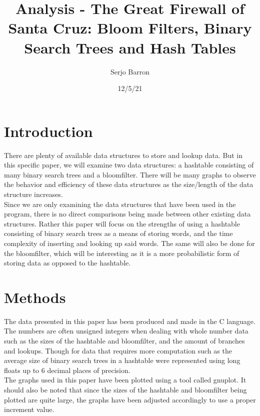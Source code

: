 \documentclass[
	12pt, %
]{fphw}
\title{Analysis - The Great Firewall of Santa Cruz:
Bloom Filters, Binary Search Trees and Hash Tables} %
\author{Serjo Barron} %
\date{12/5/21} %
\begin{document}
\maketitle %


\section{Introduction}

\hspace{15pt} There are plenty of available data structures to store and lookup data. But in this specific paper, we will examine two data structures: a hashtable consisting of many binary search trees and a bloomfilter. There will be many graphs to observe the behavior and efficiency of these data structures as the size/length of the data structure increases. \\
Since we are only examining the data structures that have been used in the program, there is no direct comparisons being made between other existing data structures. Rather this paper will focus on the strengths of using a hashtable consisting of binary search trees as a means of storing words, and the time complexity of inserting and looking up said words. The same will also be done for the bloomfilter, which will be interesting as it is a more probabilistic form of storing data as opposed to the hashtable.


\section{Methods}

\hspace{15pt} The data presented in this paper has been produced and made in the C language. The numbers are often unsigned integers when dealing with whole number data such as the sizes of the hashtable and bloomfilter, and the amount of branches and lookups. Though for data that requires more computation such as the average size of binary search trees in a hashtable were represented using long floats up to 6 decimal places of precision. \\
The graphs used in this paper have been plotted using a tool called gnuplot. It should also be noted that since the sizes of the hashtable and bloomfilter being plotted are quite large, the graphs have been adjusted accordingly to use a proper increment value.
\end{document}
